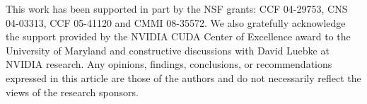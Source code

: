 \documentclass[twocolumn,10pt]{asme2ej}
\begin{document}
\begin{acknowledgment}
  This work has been supported in part by the NSF grants: CCF
  04-29753, CNS 04-03313, CCF 05-41120 and CMMI 08-35572. We also
  gratefully acknowledge the support provided by the NVIDIA CUDA
  Center of Excellence award to the University of Maryland and
  constructive discussions with David Luebke at NVIDIA research. Any
  opinions, findings, conclusions, or recommendations expressed in
  this article are those of the authors and do not necessarily reflect
  the views of the research sponsors.
\end{acknowledgment}




\nocite{*}

\end{document}
